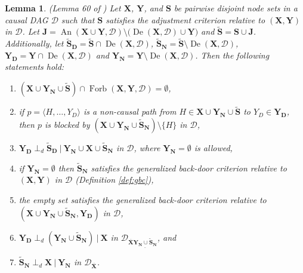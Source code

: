 \documentclass[twoside]{article}
\newtheorem{lemma}[theorem]{Lemma}
\DeclareMathOperator{\An}{An}
\DeclareMathOperator{\De}{De}
\DeclareMathOperator{\Forb}{Forb}
\newcommand{\fb}[2][X,Y]{\Forb(\mb{#1},#2)}
\newcommand\given[1][]{\:#1\vert\:}
\newcommand{\mb}[1]{\mathbf{#1}}
\newcommand{\dsepp}{\perp_{d}}
\newcommand{\g}[1][G]{\mathcal{#1}}
\begin{document}
\begin{lemma}
\label{lem:sound-setup2-perk}
{\normalfont (Lemma 60 of \citealp{perkovic2018complete})}
    Let $\mb{X}$, $\mb{Y}$, and $\mb{S}$ be pairwise disjoint node sets in a causal DAG $\g[D]$ such that $\mb{S}$ satisfies the adjustment criterion relative to $(\mb{X,Y})$ in $\g[D]$. Let $\mb{J}=\An(\mb{X} \cup \mb{Y},\g[D]) \setminus \big(\De(\mb{X}, \g[D]) \cup \mb{Y} \big)$ and $\mb{\tilde{S}}=\mb{S} \cup \mb{J}$. Additionally, let $\mb{\tilde{S}_D} = \mb{\tilde{S}} \cap \De(\mb{X}, \g[D])$, $\mb{\tilde{S}_N} = \mb{\tilde{S}} \setminus \De(\mb{X}, \g[D])$, $\mb{Y_D} = \mb{Y} \cap \De(\mb{X},\g[D])$ and $\mb{Y_N} = \mb{Y} \setminus \De(\mb{X}, \g[D])$. Then the following statements hold:
    \begin{enumerate}[label=(\roman*)]
        \item $(\mb{X} \cup \mb{Y_N} \cup \mb{\tilde{S}}) \cap \fb{\g[D]} = \emptyset$,
        
        \item if $p = \langle H, \dots, Y_D \rangle$ is a non-causal path from $H \in \mb{X} \cup \mb{Y_N} \cup \mb{\tilde{S}}$ to $Y_D \in \mb{Y_D}$, then $p$ is blocked by $(\mb{X} \cup \mb{Y_N} \cup \mb{\tilde{S}_N}) \setminus \{H\}$ in $\g[D]$,
        
        \item $\mb{Y_D} \dsepp \mb{\tilde{S}_D} \given \mb{Y_N} \cup \mb{X} \cup \mb{\tilde{S}_N}$ in $\g[D]$, where $\mb{Y_N} = \emptyset$ is allowed,
        
        \item if $\mb{Y_N} = \emptyset$ then $\mb{\tilde{S}_N}$ satisfies the generalized back-door criterion relative to $(\mb{X,Y})$ in $\g[D]$ (Definition \ref{def:gbc}),
        
        \item the empty set satisfies the generalized back-door criterion relative to $(\mb{X} \cup \mb{Y_N} \cup \mb{\tilde{S}_N},\mb{Y_D})$ in $\g[D]$,
        
        \item $\mb{Y_D} \dsepp (\mb{Y_N} \cup \mb{\tilde{S}_N}) \given \mb{X}$ in $\g[D]_{\overline{\mb{X}}\underline{\mb{Y_N} \cup  \mb{\tilde{S}_N}}}$, and

        \item $\mb{\tilde{S}_N} \dsepp \mb{X} \given \mb{Y_N}$ in $\g[D]_{\overline{\mb{X}}}$.
    \end{enumerate}
\end{lemma}
\end{document}
